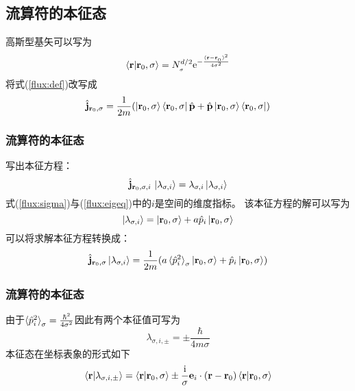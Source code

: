 \documentclass[UTF8]{beamer}
\begin{document}
\subsection{流算符的本征态}
\begin{frame}
    高斯型基矢可以写为
    \begin{equation}
        \braket{\mathbf{r}|\mathbf{r}_0,\sigma}=N_{_\sigma}^{d/2}\mathrm{e}^{-\frac{(\mathbf{r}-\mathbf{r}_{_0})^2}{4\sigma^2}}
    \end{equation}
    将式(\ref{flux:def})改写成
    \begin{equation}
        \hat{\mathbf{j}}_{\mathbf{r}_0,\sigma} = \frac{1}{2m}(\ket{\mathbf{r}_0,\sigma}\bra{\mathbf{r}_0,\sigma}\hat{\mathbf{p}}+\hat{\mathbf{p}}\ket{\mathbf{r}_0,\sigma}\bra{\mathbf{r}_0,\sigma})           
        \label{flux:sigma}
    \end{equation}
\end{frame}
\begin{frame}\frametitle{流算符的本征态}
    写出本征方程：
    \begin{equation}
        \hat{\mathbf{j}}_{\mathbf{r}_0,\sigma,i}\,\ket{\lambda_{\sigma,i}}=\lambda_{\sigma,i}\ket{\lambda_{\sigma,i}} 
        \label{flux:eigeq}
    \end{equation}
    式(\ref{flux:sigma})与(\ref{flux:eigeq})中的$i$是空间的维度指标。
    该本征方程的解可以写为
    \begin{equation*}
        \ket{\lambda_{\sigma,i}}=\ket{\mathbf{r}_0,\sigma}+a\hat{p}_i\ket{\mathbf{r}_0,\sigma}
    \end{equation*}
    可以将求解本征方程转换成：
    \begin{equation}
        \hat{\mathbf{j}}_{\mathbf{r}_0,\sigma}\ket{\lambda_{\sigma,i}} =
        \frac{1}{2m}(a\braket{\hat{p}_i^2}_{\sigma}\ket{\mathbf{r}_0,\sigma}+\hat{p}_i\ket{\mathbf{r}_0,\sigma})
    \end{equation}
\end{frame}
\begin{frame}\frametitle{流算符的本征态}
    由于$\braket{\hat{p}_i^2}_{\sigma}=\frac{\hbar^2}{4\sigma^2}$因此有两个本征值可写为
    \begin{equation}
        \lambda_{\sigma,i,\pm}=\pm\frac{\hbar}{4m\sigma}
    \end{equation}
    本征态在坐标表象的形式如下
    \begin{equation}
        \braket{\mathbf{r}|\lambda_{\sigma,i,\pm}}=
        \braket{\mathbf{r}|\mathbf{r}_0,\sigma}\pm
        \frac{\mathrm{i}}{\sigma}\mathbf{e}_i\cdot(\mathbf{r}-\mathbf{r}_0)\braket{\mathbf{r}|\mathbf{r}_0,\sigma}
        \label{husimi:eigstate}   
    \end{equation}
\end{frame}
\end{document}
